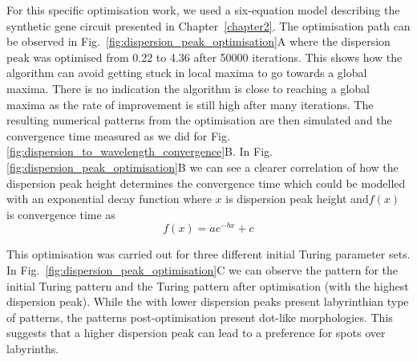 For this specific optimisation work, we used a six-equation model describing the synthetic gene circuit presented in Chapter~\ref{chapter2}.
The optimisation path can be observed in Fig.~\ref{fig:dispersion_peak_optimisation}A where the dispersion peak was optimised from 0.22 to 4.36 after 50000 iterations.
This shows how the algorithm can avoid getting stuck in local maxima to go towards a global maxima.
There is no indication the algorithm is close to reaching a global maxima as the rate of improvement is still high after many iterations.
The resulting numerical patterns from the optimisation are then simulated and the convergence time measured as we did for Fig. \ref{fig:dispersion_to_wavelength_convergence}B. In Fig. \ref{fig:dispersion_peak_optimisation}B we can see a clearer correlation of how the dispersion peak height determines the convergence time which could be modelled with an exponential decay function where $x$ is dispersion peak height and$ f(x)$ is convergence time as
\begin{equation}
    f(x) = ae^{-bx} + c
\end{equation}


This optimisation was carried out for three different initial Turing parameter sets. In Fig.~\ref{fig:dispersion_peak_optimisation}C we can observe the pattern for the initial Turing pattern and the Turing pattern after optimisation (with the highest dispersion peak).
While the with lower dispersion peaks present labyrinthian type of patterns, the patterns post-optimisation present dot-like morphologies.
This suggests that a higher dispersion peak can lead to a preference for spots over labyrinths.


